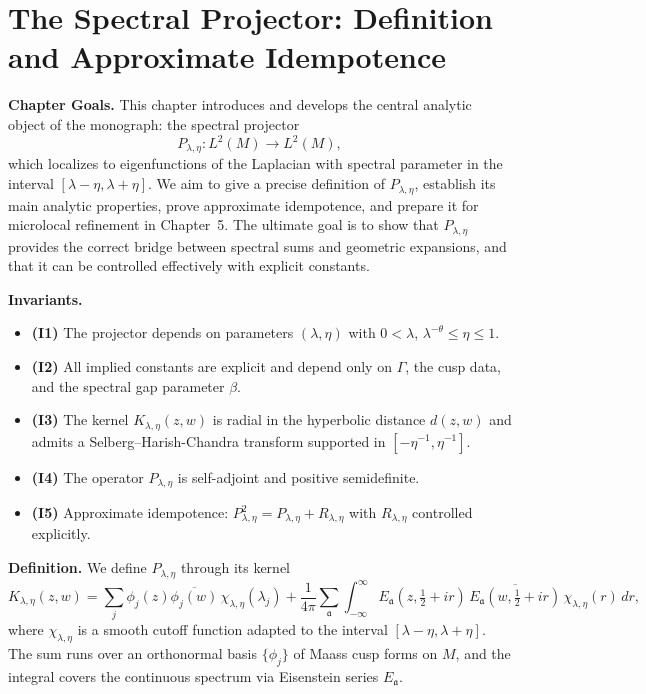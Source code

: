 \section{The Spectral Projector: Definition and Approximate Idempotence}

\noindent\textbf{Chapter Goals.}
This chapter introduces and develops the central analytic object of the monograph: the spectral projector
\[
  P_{\lambda,\eta} : L^2(M) \to L^2(M),
\]
which localizes to eigenfunctions of the Laplacian with spectral parameter in the interval
$[\lambda-\eta, \lambda+\eta]$.
We aim to give a precise definition of $P_{\lambda,\eta}$, establish its main analytic properties, prove approximate idempotence, and prepare it for microlocal refinement in Chapter~5.
The ultimate goal is to show that $P_{\lambda,\eta}$ provides the correct bridge between spectral sums and geometric expansions, and that it can be controlled effectively with explicit constants.

\medskip

\noindent\textbf{Invariants.}
\begin{itemize}
  \item \textbf{(I1)} The projector depends on parameters $(\lambda,\eta)$ with $0 < \lambda$, $\lambda^{-\theta} \leq \eta \leq 1$.
  \item \textbf{(I2)} All implied constants are explicit and depend only on $\Gamma$, the cusp data, and the spectral gap parameter $\beta$.
  \item \textbf{(I3)} The kernel $K_{\lambda,\eta}(z,w)$ is radial in the hyperbolic distance $d(z,w)$ and admits a Selberg–Harish-Chandra transform supported in $[-\eta^{-1}, \eta^{-1}]$.
  \item \textbf{(I4)} The operator $P_{\lambda,\eta}$ is self-adjoint and positive semidefinite.
  \item \textbf{(I5)} Approximate idempotence: $P_{\lambda,\eta}^2 = P_{\lambda,\eta} + R_{\lambda,\eta}$ with $R_{\lambda,\eta}$ controlled explicitly.
\end{itemize}

\medskip

\noindent\textbf{Definition.}
We define $P_{\lambda,\eta}$ through its kernel
\[
  K_{\lambda,\eta}(z,w) = \sum_{j} \phi_j(z) \overline{\phi_j(w)} \, \chi_{\lambda,\eta}(\lambda_j)
  + \frac{1}{4\pi} \sum_{\mathfrak{a}} \int_{-\infty}^{\infty}
  E_{\mathfrak{a}}(z, \tfrac{1}{2}+ir) \, \overline{E_{\mathfrak{a}}(w, \tfrac{1}{2}+ir)} \, \chi_{\lambda,\eta}(r) \, dr,
\]
where $\chi_{\lambda,\eta}$ is a smooth cutoff function adapted to the interval $[\lambda-\eta, \lambda+\eta]$.
The sum runs over an orthonormal basis $\{\phi_j\}$ of Maass cusp forms on $M$, and the integral covers the continuous spectrum via Eisenstein series $E_{\mathfrak{a}}$.

